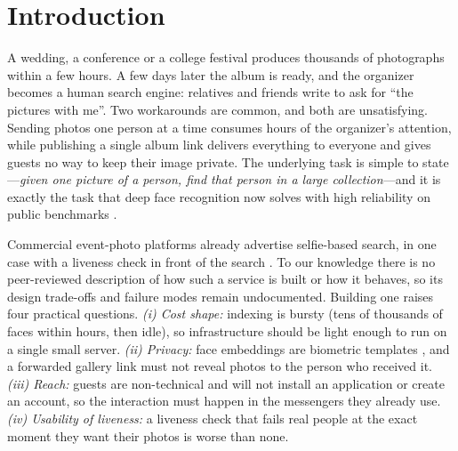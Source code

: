 \documentclass[conference]{IEEEtran}
\begin{document}
\section{Introduction}
A wedding, a conference or a college festival produces thousands of photographs within a few hours. A few days later the album is ready, and the organizer becomes a human search engine: relatives and friends write to ask for ``the pictures with me''. Two workarounds are common, and both are unsatisfying. Sending photos one person at a time consumes hours of the organizer's attention, while publishing a single album link delivers everything to everyone and gives guests no way to keep their image private. The underlying task is simple to state---\emph{given one picture of a person, find that person in a large collection}---and it is exactly the task that deep face recognition now solves with high reliability on public benchmarks \cite{taigman2014,schroff2015,deng2022arcface,wang2021survey}.

Commercial event-photo platforms already advertise selfie-based search, in one case with a liveness check in front of the search \cite{kamero,picsolv}. To our knowledge there is no peer-reviewed description of how such a service is built or how it behaves, so its design trade-offs and failure modes remain undocumented. Building one raises four practical questions. \emph{(i) Cost shape:} indexing is bursty (tens of thousands of faces within hours, then idle), so infrastructure should be light enough to run on a single small server. \emph{(ii) Privacy:} face embeddings are biometric templates \cite{mai2019reconstruction,gdpr}, and a forwarded gallery link must not reveal photos to the person who received it. \emph{(iii) Reach:} guests are non-technical and will not install an application or create an account, so the interaction must happen in the messengers they already use. \emph{(iv) Usability of liveness:} a liveness check that fails real people at the exact moment they want their photos is worse than none.
\end{document}
